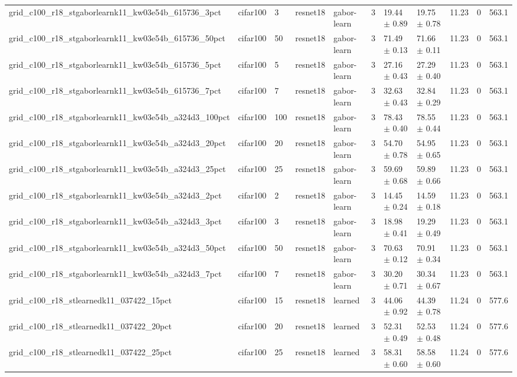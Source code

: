 \begin{tabular}{lllllllllll}
grid_c100_r18_stgaborlearnk11_kw03e54b_615736_3pct & cifar100 & 3 & resnet18 & gabor-learn & 3 & 19.44 $\pm$ 0.89 & 19.75 $\pm$ 0.78 & 11.23 & 0 & 563.1 \\
grid_c100_r18_stgaborlearnk11_kw03e54b_615736_50pct & cifar100 & 50 & resnet18 & gabor-learn & 3 & 71.49 $\pm$ 0.13 & 71.66 $\pm$ 0.11 & 11.23 & 0 & 563.1 \\
grid_c100_r18_stgaborlearnk11_kw03e54b_615736_5pct & cifar100 & 5 & resnet18 & gabor-learn & 3 & 27.16 $\pm$ 0.43 & 27.29 $\pm$ 0.40 & 11.23 & 0 & 563.1 \\
grid_c100_r18_stgaborlearnk11_kw03e54b_615736_7pct & cifar100 & 7 & resnet18 & gabor-learn & 3 & 32.63 $\pm$ 0.43 & 32.84 $\pm$ 0.29 & 11.23 & 0 & 563.1 \\
grid_c100_r18_stgaborlearnk11_kw03e54b_a324d3_100pct & cifar100 & 100 & resnet18 & gabor-learn & 3 & 78.43 $\pm$ 0.40 & 78.55 $\pm$ 0.44 & 11.23 & 0 & 563.1 \\
grid_c100_r18_stgaborlearnk11_kw03e54b_a324d3_20pct & cifar100 & 20 & resnet18 & gabor-learn & 3 & 54.70 $\pm$ 0.78 & 54.95 $\pm$ 0.65 & 11.23 & 0 & 563.1 \\
grid_c100_r18_stgaborlearnk11_kw03e54b_a324d3_25pct & cifar100 & 25 & resnet18 & gabor-learn & 3 & 59.69 $\pm$ 0.68 & 59.89 $\pm$ 0.66 & 11.23 & 0 & 563.1 \\
grid_c100_r18_stgaborlearnk11_kw03e54b_a324d3_2pct & cifar100 & 2 & resnet18 & gabor-learn & 3 & 14.45 $\pm$ 0.24 & 14.59 $\pm$ 0.18 & 11.23 & 0 & 563.1 \\
grid_c100_r18_stgaborlearnk11_kw03e54b_a324d3_3pct & cifar100 & 3 & resnet18 & gabor-learn & 3 & 18.98 $\pm$ 0.41 & 19.29 $\pm$ 0.49 & 11.23 & 0 & 563.1 \\
grid_c100_r18_stgaborlearnk11_kw03e54b_a324d3_50pct & cifar100 & 50 & resnet18 & gabor-learn & 3 & 70.63 $\pm$ 0.12 & 70.91 $\pm$ 0.34 & 11.23 & 0 & 563.1 \\
grid_c100_r18_stgaborlearnk11_kw03e54b_a324d3_7pct & cifar100 & 7 & resnet18 & gabor-learn & 3 & 30.20 $\pm$ 0.71 & 30.34 $\pm$ 0.67 & 11.23 & 0 & 563.1 \\
grid_c100_r18_stlearnedk11_037422_15pct & cifar100 & 15 & resnet18 & learned & 3 & 44.06 $\pm$ 0.92 & 44.39 $\pm$ 0.78 & 11.24 & 0 & 577.6 \\
grid_c100_r18_stlearnedk11_037422_20pct & cifar100 & 20 & resnet18 & learned & 3 & 52.31 $\pm$ 0.49 & 52.53 $\pm$ 0.48 & 11.24 & 0 & 577.6 \\
grid_c100_r18_stlearnedk11_037422_25pct & cifar100 & 25 & resnet18 & learned & 3 & 58.31 $\pm$ 0.60 & 58.58 $\pm$ 0.60 & 11.24 & 0 & 577.6 \\

\end{tabular}
